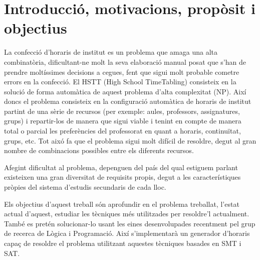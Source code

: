 \documentclass[11pt,a4paper,twoside]{report}
\begin{document}
  \tableofcontents
  
  \chapter{Introducció, motivacions, propòsit i objectius}
  

  La confecció d'horaris de institut es un problema que amaga una alta combinatòria, dificultant-ne molt la seva elaboració manual posat que s'han de prendre moltíssimes decisions a cegues, 
  fent que sigui molt probable cometre errors en la confecció. El HSTT (High School TimeTabling) consisteix en la solució de forma automàtica de aquest problema d'alta complexitat (NP). 
  Així doncs el problema consisteix en la configuració automàtica de horaris de institut partint de una sèrie de recursos 
  (per exemple: aules, professors, assignatures, grups) i repartir-los de manera que sigui viable i tenint en compte 
  de manera total o parcial les preferències del professorat en quant a horaris, continuïtat, grups, etc. Tot aixó fa que el problema sigui molt difícil de resoldre, degut al gran nombre de combinacions possibles entre els diferents recursos.
  
  Afegint dificultat al problema, depenguen del país del qual estiguem parlant existeixen una gran diversitat de requisits propis, degut a les característiques pròpies del sistema d'estudis secundaris de cada lloc.
  
  Els objectius d'aquest treball són aprofundir en el problema treballat, l'estat actual d'aquest, estudiar les tècniques més utilitzades per resoldre'l actualment. També es pretén solucionar-lo usant les eines desenvolupades recentment pel grup de recerca de Lògica i Programació. Així s'implementarà un generador 
  d'horaris capaç de resoldre el problema utilitzant aquestes tècniques basades en SMT i SAT.
  
\end{document}
